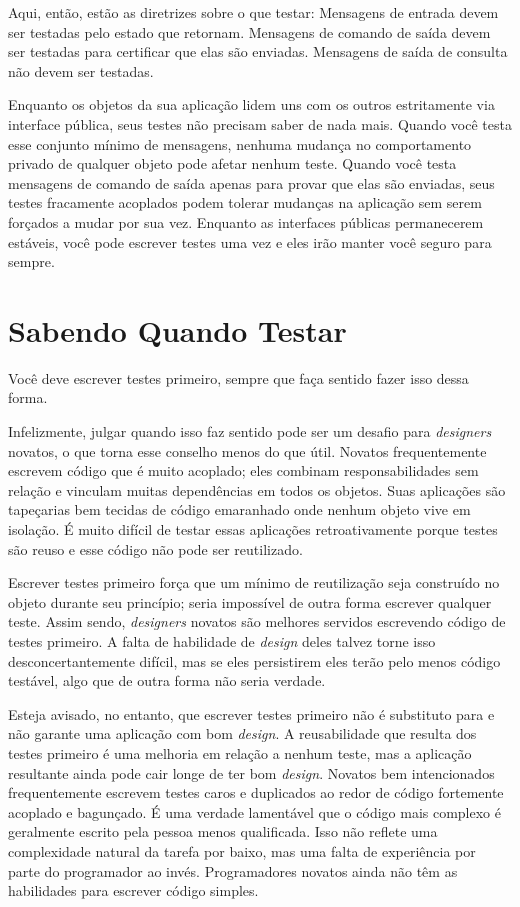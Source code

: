 Aqui, então, estão as diretrizes sobre o que testar: Mensagens de entrada devem ser testadas pelo estado que retornam. Mensagens de comando de saída devem ser testadas para certificar que elas são enviadas. Mensagens de saída de consulta não devem ser testadas.

Enquanto os objetos da sua aplicação lidem uns com os outros estritamente via interface pública, seus testes não precisam saber de nada mais. Quando você testa esse conjunto mínimo de mensagens, nenhuma mudança no comportamento privado de qualquer objeto pode afetar nenhum teste. Quando você testa mensagens de comando de saída apenas para provar que elas são enviadas, seus testes fracamente acoplados podem tolerar mudanças na aplicação sem serem forçados a mudar por sua vez. Enquanto as interfaces públicas permanecerem estáveis, você pode escrever testes uma vez e eles irão manter você seguro para sempre.

\section{Sabendo Quando Testar}

Você deve escrever testes primeiro, sempre que faça sentido fazer isso dessa forma.

Infelizmente, julgar quando isso faz sentido pode ser um desafio para \textit{designers} novatos, o que torna esse conselho menos do que útil. Novatos frequentemente escrevem código que é muito acoplado; eles combinam responsabilidades sem relação e vinculam muitas dependências em todos os objetos. Suas aplicações são tapeçarias bem tecidas de código emaranhado onde nenhum objeto vive em isolação. É muito difícil de testar essas aplicações retroativamente porque testes são reuso e esse código não pode ser reutilizado.

Escrever testes primeiro força que um mínimo de reutilização seja construído no objeto durante seu princípio; seria impossível de outra forma escrever qualquer teste. Assim sendo, \textit{designers} novatos são melhores servidos escrevendo código de testes primeiro. A falta de habilidade de \textit{design} deles talvez torne isso desconcertantemente difícil, mas se eles persistirem eles terão pelo menos código testável, algo que de outra forma não seria verdade.

Esteja avisado, no entanto, que escrever testes primeiro não é substituto para e não garante uma aplicação com bom \textit{design}. A reusabilidade que resulta dos testes primeiro é uma melhoria em relação a nenhum teste, mas a aplicação resultante ainda pode cair longe de ter bom \textit{design}. Novatos bem intencionados frequentemente escrevem testes caros e duplicados ao redor de código fortemente acoplado e bagunçado. É uma verdade lamentável que o código mais complexo é geralmente escrito pela pessoa menos qualificada. Isso não reflete uma complexidade natural da tarefa por baixo, mas uma falta de experiência por parte do programador ao invés. Programadores novatos ainda não têm as habilidades para escrever código simples.

